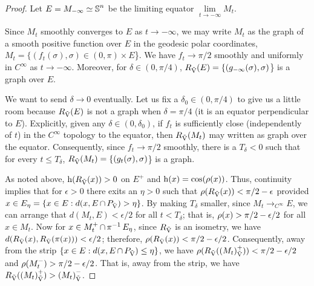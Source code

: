 \documentclass{amsart}
\theoremstyle{definition}
\theoremstyle{remark}
\numberwithin{equation}{section}
\begin{document}
\begin{proof}
Let \(E = M_{-\infty} \simeq \operatorname{\mathbb{S}}^n\) be the limiting equator \(\lim\limits_{t\to-\infty} M_t\).

Since \(M_t\) smoothly converges to \(E\) as \(t\to-\infty\), we may write \(M_t\) as the graph of a smooth positive function over \(E\) in the geodesic polar coordinates, \(M_t = \{(f_t(\sigma), \sigma) \in (0,\pi) \times E\)\}. We have \(f_t \to \pi/2\) smoothly and uniformly in \(C^{\infty}\) as \(t \to -\infty\). Moreover, for \(\delta \in (0,\pi/4)\), \(R_{\operatorname{\vec{V}}}(E) = \{(g_{-\infty}(\sigma), \sigma)\)\} is a graph over \(E\).

We want to send \(\delta \to 0\) eventually. Let us fix a \(\delta_0 \in (0,\pi/4)\) to give us a little room because \(R_{\operatorname{\vec{V}}}(E)\) is not a graph when \(\delta = \pi/4\) (it is an equator perpendicular to \(E\)). Explicitly, given any \(\delta \in (0,\delta_0)\), if \(f_t\) is sufficiently close (independently of \(t\)) in the \(C^{\infty}\) topology to the equator, then \(R_{\operatorname{\vec{V}}}(M_t)\) may written as graph over the equator. Consequently, since \(f_t \to \pi/2\) smoothly, there is a \(T_{\delta} < 0\) such that for every \(t \leq T_{\delta}\), \(R_{\operatorname{\vec{V}}}(M_t) =\{ (g_t(\sigma), \sigma)\)\} is a graph.

As noted above, \(\operatorname{h}(R_{\operatorname{\vec{V}}}(x)) > 0\) on \(E^+\) and \(\operatorname{h}(x) = \cos(\operatorname{\rho}(x))\). Thus, continuity implies that for \(\epsilon > 0\) there exits an \(\eta>0\) such that \(\operatorname{\rho}(R_{\operatorname{\vec{V}}}(x)) < \pi/2 - \epsilon\) provided \(x \in E_{\eta} = \{x \in E: d(x, E \operatorname{\cap} P_{\operatorname{\vec{V}}}) > \eta\}\). By making \(T_{\delta}\) smaller, since \(M_t \to_{C^{\infty}} E\), we can arrange that \(d(M_t, E) < \epsilon/2\) for all \(t < T_{\delta}\); that is, \(\operatorname{\rho} (x) > \pi/2 - \epsilon/2\) for all \(x \in M_t\). Now for \(x \in M_t^+ \operatorname{\cap} \operatorname{\pi}^{-1} E_{\eta}\), since \(R_{\operatorname{\vec{V}}}\) is an isometry, we have \(d(R_{\operatorname{\vec{V}}}(x), R_{\operatorname{\vec{V}}}(\operatorname{\pi}(x))) < \epsilon/2\); therefore, \(\operatorname{\rho}(R_{\operatorname{\vec{V}}}(x)) < \pi/2 - \epsilon/2\). Consequently, away from the strip \(\{x \in E: d(x, E \operatorname{\cap} P_{\operatorname{\vec{V}}}) \leq \eta\}\), we have \(\operatorname{\rho}(R_{\operatorname{\vec{V}}}({(M_t)}_{\operatorname{\vec{V}}}^+)) < \pi/2 - \epsilon/2\) and \(\operatorname{\rho}(M_t^-) > \pi/2 - \epsilon/2\). That is, away from the strip, we have \(R_{\operatorname{\vec{V}}}({(M_t)}_{\operatorname{\vec{V}}}^+) > {(M_t)}_{\operatorname{\vec{V}}}^-\).


\end{proof}
\end{document}
